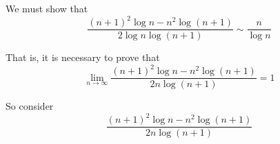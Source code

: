\documentclass{unswmaths}
\begin{document}
    We must show that
    \begin{equation*}
        \frac{(n+1)^2\log{n}-n^2\log(n+1)}{2\log{n}\log(n+1)} \sim \frac{n}{\log{n}}
    \end{equation*}
    
    That is, it is necessary to prove that
    \begin{equation*}
        \lim_{n\rightarrow\infty} \frac{(n+1)^2\log{n}-n^2\log(n+1)}{2n\log(n+1)} = 1
    \end{equation*}
    
    So consider
    \begin{equation*}
        \frac{(n+1)^2\log{n}-n^2\log(n+1)}{2n\log(n+1)} 
    \end{equation*}
\end{document}
